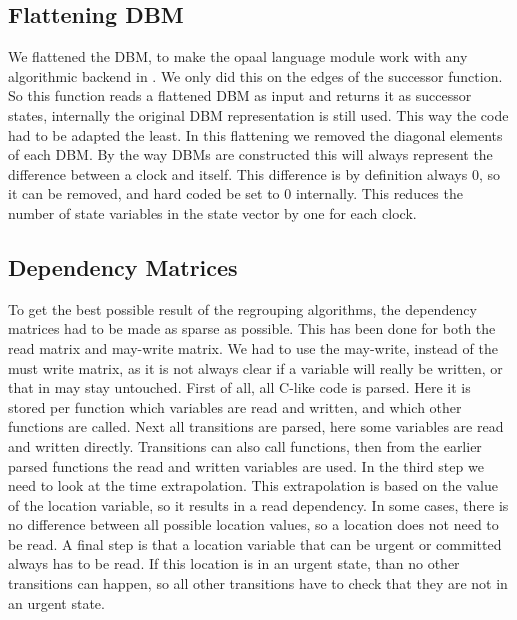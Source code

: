 \subsection{Flattening DBM}
We flattened the DBM, to make the opaal language module work with any algorithmic backend in \ltsmin{}. We only did this on the edges of the successor function. So this function reads a flattened DBM as input and returns it as successor states, internally the original DBM representation is still used. This way the code had to be adapted the least. In this flattening we removed the diagonal elements of each DBM. By the way DBMs are constructed this will always represent the difference between a clock and itself. This difference is by definition always 0, so it can be removed, and hard coded be set to 0 internally. This reduces the number of state variables in the state vector by one for each clock.

\subsection{Dependency Matrices}
To get the best possible result of the regrouping algorithms, the dependency matrices had to be made as sparse as possible. This has been done for both the read matrix and may-write matrix. We had to use the may-write, instead of the must write matrix, as it is not always clear if a variable will really be written, or that in may stay untouched. First of all, all C-like code is parsed. Here it is stored per function which variables are read and written, and which other functions are called. Next all transitions are parsed, here some variables are read and written directly. Transitions can also call functions, then from the earlier parsed functions the read and written variables are used. In the third step we need to look at the time extrapolation. This extrapolation is based on the value of the location variable, so it results in a read dependency. In some cases, there is no difference between all possible location values, so a location does not need to be read. A final step is that a location variable that can be urgent or committed always has to be read. If this location is in an urgent state, than no other transitions can happen, so all other transitions have to check that they are not in an urgent state.

